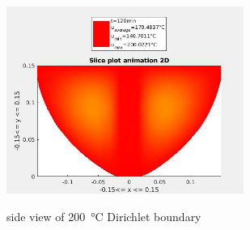 \begin{figure}[htp]
{        \includegraphics[width=0.69\textwidth]{figures/dirichlet_200_2D121.png}
        }
        \caption{\label{fig::dirichlet2D} side view of 200\SI{}{\degreeCelsius} Dirichlet boundary}
\end{figure}

